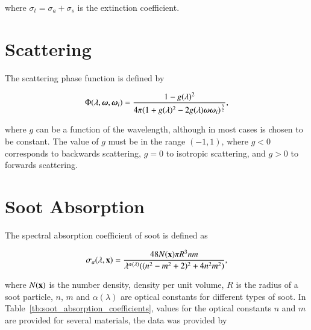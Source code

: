 where $\sigma_t = \sigma_a + \sigma_s$ is the extinction coefficient.

\section{Scattering}
\label{sec:scattering}

The scattering phase function is defined by

\begin{equation}
\Phi (\lambda, \boldsymbol{\omega}, \boldsymbol{\omega}_i) = \frac{1 - g(\lambda)^2}{4 \pi(1 + g(\lambda)^2 - 2 g(\lambda) \boldsymbol{\omega} \boldsymbol{\omega}_i)^{\frac{3}{2}}},
\end{equation}

where $g$ can be a function of the wavelength, although in most cases is chosen to be constant.
The value of $g$ must be in the range $(-1, 1)$, where $g < 0$ corresponds to backwards scattering, $g = 0$ to isotropic scattering, and $g > 0$ to forwards scattering.

\section{Soot Absorption}
\label{sec:soot_absorption}

The spectral absorption coefficient of soot is defined as

\begin{equation}
\sigma_a(\lambda, \mathbf{x}) = \frac{48 N(\mathbf{x}) \pi R^3 n m}{\lambda^{\alpha(\lambda)} ((n^2 - m^2 +2)^2 + 4 n^2 m^2)},
\end{equation}

where $N(\mathbf{x})$ is the number density, density per unit volume, $R$ is the radius of a soot particle, $n$, $m$ and $\alpha(\lambda)$ are optical constants for different types of soot.
In Table~\ref{tb:soot_absorption_coefficients}, values for the optical constants $n$ and $m$ are provided for several materials, the data was provided by~\cite{Dalzell:1969}

